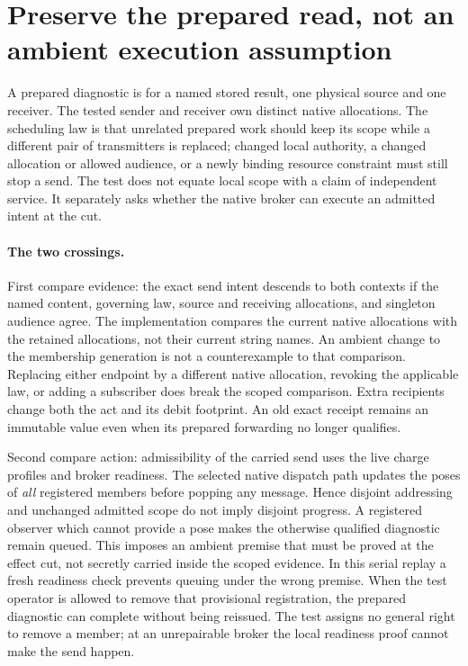 \documentclass{article}
\begin{document}
\section*{Preserve the prepared read, not an ambient execution assumption}
A prepared diagnostic is for a named stored result, one physical
source and one receiver. The tested sender and receiver own distinct
native allocations. The scheduling law is that unrelated prepared
work should keep its scope while a different pair of transmitters
is replaced; changed local authority, a changed allocation or allowed
audience, or a newly binding resource constraint must still stop a
send. The test does not equate local scope with a claim of independent
service. It separately asks whether the native broker can execute
an admitted intent at the cut.

\paragraph{The two crossings.}
First compare evidence: the exact send intent descends to both
contexts if the named content, governing law, source and receiving
allocations, and singleton audience agree. The implementation
compares the current native allocations with the retained
allocations, not their current string names. An ambient change to
the membership generation is not a counterexample to that
comparison. Replacing either endpoint by a different native
allocation, revoking the applicable law, or adding a subscriber
does break the scoped comparison. Extra recipients change both
the act and its debit footprint. An old exact receipt remains an
immutable value even when its prepared forwarding no longer
qualifies.

Second compare action: admissibility of the carried send uses
the live charge profiles and broker readiness. The selected native
dispatch path updates the poses of \emph{all} registered members
before popping any message. Hence disjoint addressing and
unchanged admitted scope do not imply disjoint progress. A
registered observer which cannot provide a pose makes the
otherwise qualified diagnostic remain queued. This imposes an
ambient premise that must be proved at the effect cut, not
secretly carried inside the scoped evidence. In this serial replay
a fresh readiness check prevents queuing under the wrong premise.
When the test operator is allowed to remove that provisional
registration, the prepared diagnostic can complete without being
reissued. The test assigns no general right to remove a member;
at an unrepairable broker the local readiness proof cannot make
the send happen.
\end{document}
